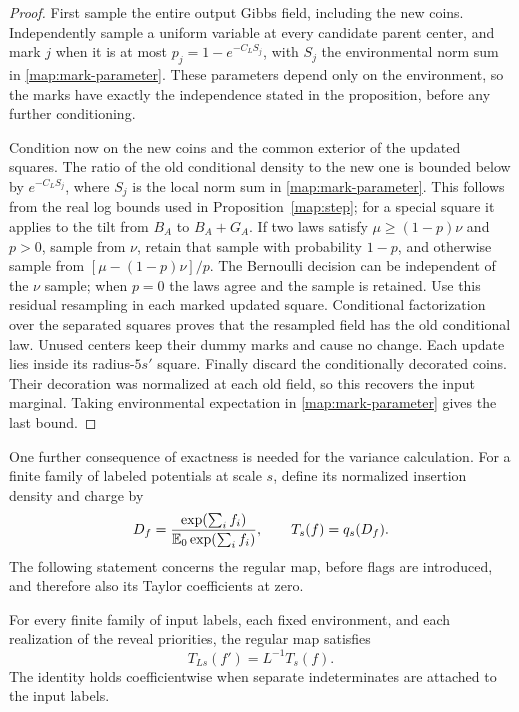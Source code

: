 \begin{proof}
First sample the entire output Gibbs field, including the new coins.
Independently sample a uniform variable at every candidate parent
center, and mark $j$ when it is at most
$p_j=1-e^{-C_LS_j}$, with $S_j$ the environmental norm sum in
\eqref{map:mark-parameter}.  These parameters depend only on the
environment, so the marks have exactly the independence stated in the
proposition, before any further conditioning.

Condition now on the new coins and the common exterior of the updated
squares.  The ratio of the old conditional density to the new one is
bounded below by $e^{-C_LS_j}$, where $S_j$ is the local norm sum in
\eqref{map:mark-parameter}.  This follows from the real log bounds used
in Proposition~\ref{map:step}; for a special square it applies to the
tilt from $B_A$ to $B_A+G_A$.  If two laws satisfy
$\mu\ge(1-p)\nu$ and $p>0$, sample from $\nu$, retain that sample with probability
$1-p$, and otherwise sample from
$[\mu-(1-p)\nu]/p$.  The Bernoulli decision can be independent of the
$\nu$ sample; when $p=0$ the laws agree and the sample is retained.
Use this residual resampling in each marked updated square.  Conditional
factorization over the separated squares proves that the resampled
field has the old conditional law.  Unused centers keep their dummy
marks and cause no change.  Each update lies inside its radius-$5s'$ square.
Finally discard the conditionally decorated coins.  Their decoration
was normalized at each old field, so this recovers the input marginal.
Taking environmental expectation in \eqref{map:mark-parameter} gives
the last bound.
\end{proof}

One further consequence of exactness is needed for the variance
calculation.  For a finite family of labeled potentials at scale $s$,
define its normalized insertion density and charge by
\[
 D_f=\frac{\exp(\sum_i f_i)}{\mathbb E_0\exp(\sum_i f_i)},
 \qquad T_s(f)=q_s(D_f).
\]
The following statement concerns the regular map, before flags are
introduced, and therefore also its Taylor coefficients at zero.

\begin{corollary}\label{map:insertion-charge}
For every finite family of input labels, each fixed environment, and
each realization of the reveal priorities, the regular map satisfies
\[
 T_{Ls}(f')=L^{-1}T_s(f).
\]
The identity holds coefficientwise when separate indeterminates are
attached to the input labels.
\end{corollary}

